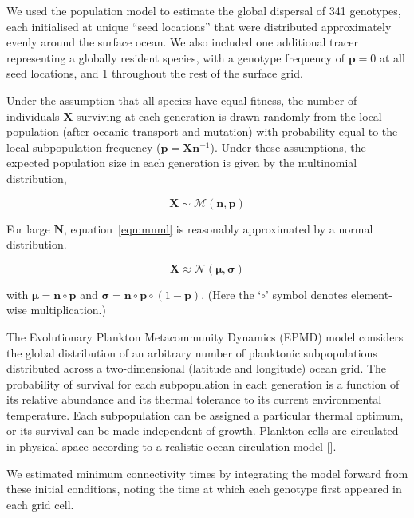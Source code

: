 \documentclass[12pt]{article}
\begin{document}
We used the population model to estimate the global dispersal of 341 genotypes, each initialised at unique ``seed locations'' that were distributed approximately evenly around the surface ocean. We also included one additional tracer representing a globally resident species, with a genotype frequency of $\mathbf{p} = 0$ at all seed locations, and 1 throughout the rest of the surface grid.

Under the assumption that all species have equal fitness, the number of individuals $\mathbf{X}$ surviving at each generation is drawn randomly from the local population (after oceanic transport and mutation) with probability equal to the local subpopulation frequency ($\mathbf{p} = \mathbf{X} \mathbf{n}^{-1}$). Under these assumptions, the expected population size in each generation is given by the multinomial distribution, 

\begin{equation}
\label{eqn:mnml}
\mathbf{X}\sim\mathcal{M}(\mathbf{n},\mathbf{p})
\end{equation}

For large $\mathbf{N}$, equation~\ref{eqn:mnml} is reasonably approximated by a normal distribution.

\begin{equation}
\mathbf{X}\approx\mathcal{N}(\boldsymbol{\mu},\boldsymbol{\sigma})
\end{equation}

with $\boldsymbol{\mu}=\mathbf{n}\circ\mathbf{p}$ and $\boldsymbol{\sigma}=\mathbf{n}\circ\mathbf{p}\circ(1-\mathbf{p})$. (Here the `$\circ$' symbol denotes element-wise multiplication.)




The Evolutionary Plankton Metacommunity Dynamics (EPMD) model considers the global distribution of an arbitrary number of planktonic subpopulations distributed across a two-dimensional (latitude and longitude) ocean grid. The probability of survival for each subpopulation in each generation is a function of its relative abundance and its thermal tolerance to its current environmental temperature. Each subpopulation can be assigned a particular thermal optimum, or its survival can be made independent of growth. Plankton cells are circulated in physical space according to a realistic ocean circulation model \ref{}. 



We estimated minimum connectivity times by integrating the model forward from these initial conditions, noting the time at which each genotype first appeared in each grid cell. 
\end{document}
